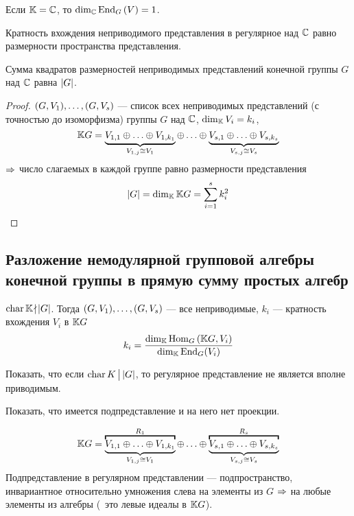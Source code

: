 Если $\mathbb{K} = \mathbb{C}$, то $\dim_{\mathbb{C}} \operatorname{End}_{G} \left(V\right) = 1$.
\begin{stm}
	Кратность вхождения неприводимого представления в регулярное над $\mathbb{C}$
	равно размерности пространства представления.
\end{stm}
\begin{imp}
	Сумма квадратов размерностей неприводимых представлений
	конечной группы $G$ над $\mathbb{C}$ равна $\left|G\right|$.
\end{imp}
\begin{proof}
	$(G, V_1) ,\ldots, (G, V_s)$ --- список всех неприводимых представлений (с точностью до изоморфизма)
	группы $G$ над $\mathbb{C}$, $\dim_{\mathbb{K}} V_i = k_i$,
	$$
		\K G = \ub{V_{1,1} \sop V_{1,k_1}}_{V_{1, j} \cong V_1} \sop
		\ub{V_{s,1} \sop V_{s,k_s}}_{V_{s, j} \cong V_s}
	$$
	$\Rightarrow$ число слагаемых в каждой группе равно размерности представления
	$$
		\left|G\right| = \dim_{\mathbb{K}} \mathbb{K} G = \sum_{i = 1}^s k_i^2
	$$
\end{proof}


\subsection{Разложение немодулярной групповой алгебры конечной группы в прямую сумму простых алгебр}
$\operatorname{char} \mathbb{K} \!\nmid\! \left|G\right|$.
Тогда $(G, V_1) ,\ldots, (G, V_s)$ --- все неприводимые,
$k_i$ --- кратность вхождения $V_i$ в $\mathbb{K} G$
$$
	k_i = \frac{\dim_{\mathbb{K}}\operatorname{Hom}_G\left(\mathbb{K} G, V_i\right)}{\dim_{\mathbb{K}}\operatorname{End}_G(V_i)}
$$
\begin{problem}
	Показать, что если $\operatorname{char} K \,\bigl\rvert\, \left|G\right|$,
	то регулярное представление не является вполне приводимым.
\end{problem}
\begin{hint}
	Показать, что имеется подпредставление и на него нет проекции.
\end{hint}
\begin{equation}
	\K G = \obt{\ub{V_{1,1} \sop V_{1,k_1}}_{V_{1, j} \cong V_1}}^{R_1} \sop
	\obt{\ub{V_{s,1} \sop V_{s,k_s}}_{V_{s, j} \cong V_s}}^{R_s}
\end{equation}
Подпредставление в регулярном представлении --- подпространство,
инвариантное относительно умножения слева на элементы из $G$ $\Rightarrow$
на любые элементы из алгебры
(\ie\ это левые идеалы в $\mathbb{K} G$).


